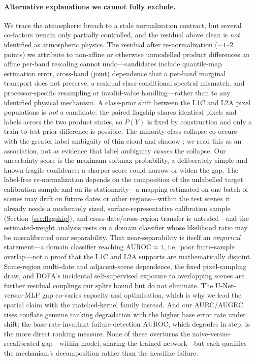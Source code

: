 \documentclass[preprint,3p,times]{elsarticle}
\begin{document}
\paragraph{Alternative explanations we cannot fully exclude.} We trace the atmospheric breach to a stale normalization contract, but several co-factors remain only partially controlled, and the residual above clean is \emph{not} identified as atmospheric physics. The residual after re-normalization (${\sim}1$--$2$ points) we attribute to non-affine or otherwise unmodelled product differences an affine per-band rescaling cannot undo---candidates include quantile-map estimation error, cross-band (joint) dependence that a per-band marginal transport does not preserve, a residual class-conditional spectral mismatch, and processor-specific resampling or invalid-value handling---rather than to any identified physical mechanism. A class-prior shift between the L1C and L2A pixel populations is \emph{not} a candidate: the paired flagship shares identical pixels and labels across the two product states, so $P(Y)$ is fixed by construction and only a train-to-test prior difference is possible. The minority-class collapse co-occurs with the greater label ambiguity of thin cloud and shadow \citep{aybar2022cloudsen12}; we read this as an association, not as evidence that label ambiguity \emph{causes} the collapse. Our uncertainty score is the maximum softmax probability, a deliberately simple and known-fragile confidence; a sharper score could narrow or widen the gap. The label-free re-normalization depends on the composition of the unlabelled target calibration sample and on its stationarity---a mapping estimated on one batch of scenes may drift on future dates or other regions---within the test scenes it already needs a moderately sized, surface-representative calibration sample (Section~\ref{sec:flagship}), and cross-date/cross-region transfer is untested---and the estimated-weight analysis rests on a domain classifier whose likelihood ratio may be miscalibrated near separability. That near-separability is itself an \emph{empirical} statement---a domain classifier reaching AUROC${\approx}1$, i.e.\ poor finite-sample overlap---not a proof that the L1C and L2A supports are mathematically disjoint. Same-region multi-date and adjacent-scene dependence, the fixed pixel-sampling draw, and DOFA's incidental self-supervised exposure to overlapping scenes are further residual couplings our splits bound but do not eliminate. The U-Net-versus-MLP gap co-varies capacity and optimisation, which is why we lead the spatial claim with the matched-kernel family instead. And our AURC/AUGRC rises conflate genuine ranking degradation with the higher base error rate under shift; the base-rate-invariant failure-detection AUROC, which degrades in step, is the more direct ranking measure. None of these overturns the naive-versus-recalibrated gap---within-model, sharing the trained network---but each qualifies the mechanism's decomposition rather than the headline failure.
\end{document}
